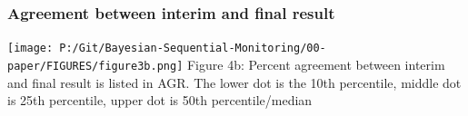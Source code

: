 \documentclass[12pt]{article}
\begin{document}
\subsubsection{Agreement between interim and final result}
\begin{center}
\texttt{[image: P:/Git/Bayesian-Sequential-Monitoring/00-paper/FIGURES/figure3b.png]}
Figure 4b: Percent agreement between interim and final result is listed in AGR. The lower dot is the 10th percentile, middle dot is 25th percentile, upper dot is 50th percentile/median
\end{center}


\end{document}
